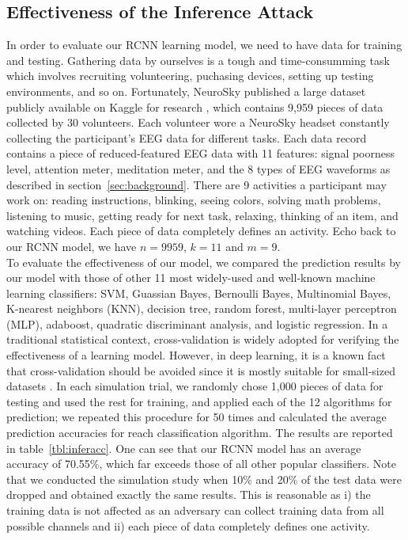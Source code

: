 \subsection{Effectiveness of the Inference Attack}
In order to evaluate our RCNN learning model, we need to have data for training and testing. Gathering data by ourselves is a tough and time-consumming task which involves recruiting volunteering, puchasing devices, setting up testing environments, and so on. Fortunately, NeuroSky published a large dataset publicly available on Kaggle for research \cite{neuroskydata}, which contains 9,959 pieces of data collected by 30 volunteers. Each volunteer wore a NeuroSky headset constantly collecting the participant's EEG data for different tasks. Each data record contains a piece of reduced-featured EEG data with 11 features: signal poorness level, attention meter, meditation meter, and the 8 types of EEG waveforms as described in section~\ref{sec:background}. There are 9 activities a participant may work on: reading instructions, blinking, seeing colors, solving math problems, listening to music, getting ready for next task, relaxing, thinking of an item, and watching videos. Each piece of data completely defines an activity. Echo back to our RCNN model, we have $n=9959$, $k=11$ and $m=9$.\\
%
\indent To evaluate the effectiveness of our model, we compared the prediction results by our model with those of other 11 most widely-used and well-known machine learning classifiers: SVM, Guassian Bayes, Bernoulli Bayes, Multinomial Bayes, K-nearest neighbors (KNN), decision tree, random forest, multi-layer perceptron (MLP), adaboost, quadratic discriminant analysis, and logistic regression. In a traditional statistical context, cross-validation is widely adopted for verifying the effectiveness of a learning model. However, in deep learning, it is a known fact that cross-validation should be avoided  since it is mostly suitable for small-sized datasets \cite{deepcrossvalid}. In each simulation trial, we randomly chose 1,000 pieces of data for testing and used the rest for training, and applied each of the 12 algorithms for prediction; we repeated this procedure for 50 times and calculated the average prediction accuracies for reach classification algorithm. The results are reported in table~\ref{tbl:inferacc}. One can see that our RCNN model has an average accuracy of 70.55\%, which far exceeds those of all other popular classifiers. Note that we conducted the simulation study when 10\% and 20\% of the test data were dropped and obtained exactly the same results. This is reasonable as i) the training data is not affected as an adversary can collect training data from all possible channels and ii) each piece of data completely defines one activity. 


